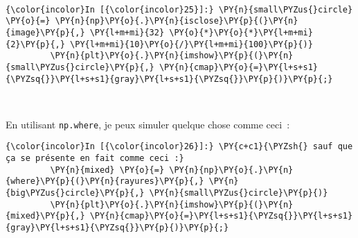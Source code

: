     \begin{center}
    \end{center}
    { \hspace*{\fill} \\}
    
    \begin{Verbatim}[commandchars=\\\{\}]
{\color{incolor}In [{\color{incolor}25}]:} \PY{n}{small\PYZus{}circle} \PY{o}{=} \PY{n}{np}\PY{o}{.}\PY{n}{isclose}\PY{p}{(}\PY{n}{image}\PY{p}{,} \PY{l+m+mi}{32} \PY{o}{*}\PY{o}{*}\PY{l+m+mi}{2}\PY{p}{,} \PY{l+m+mi}{10}\PY{o}{/}\PY{l+m+mi}{100}\PY{p}{)}
         \PY{n}{plt}\PY{o}{.}\PY{n}{imshow}\PY{p}{(}\PY{n}{small\PYZus{}circle}\PY{p}{,} \PY{n}{cmap}\PY{o}{=}\PY{l+s+s1}{\PYZsq{}}\PY{l+s+s1}{gray}\PY{l+s+s1}{\PYZsq{}}\PY{p}{)}\PY{p}{;}
\end{Verbatim}


    \begin{center}
    \end{center}
    { \hspace*{\fill} \\}
    
    En utilisant \texttt{np.where}, je peux simuler quelque chose comme
ceci~:

\begin{Shaded}
\begin{Highlighting}[]
\OperatorTok{=}
\end{Highlighting}
\end{Shaded}

    \begin{Verbatim}[commandchars=\\\{\}]
{\color{incolor}In [{\color{incolor}26}]:} \PY{c+c1}{\PYZsh{} sauf que ça se présente en fait comme ceci :}
         \PY{n}{mixed} \PY{o}{=} \PY{n}{np}\PY{o}{.}\PY{n}{where}\PY{p}{(}\PY{n}{rayures}\PY{p}{,} \PY{n}{big\PYZus{}circle}\PY{p}{,} \PY{n}{small\PYZus{}circle}\PY{p}{)}
         \PY{n}{plt}\PY{o}{.}\PY{n}{imshow}\PY{p}{(}\PY{n}{mixed}\PY{p}{,} \PY{n}{cmap}\PY{o}{=}\PY{l+s+s1}{\PYZsq{}}\PY{l+s+s1}{gray}\PY{l+s+s1}{\PYZsq{}}\PY{p}{)}\PY{p}{;}
\end{Verbatim}


